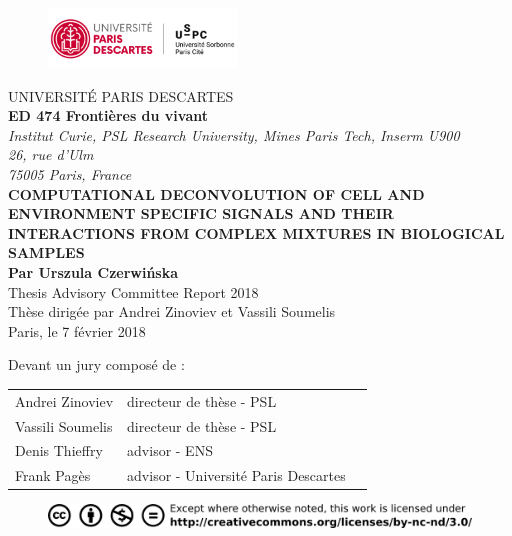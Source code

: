 \documentclass[12pt,]{book}
\title{}
\author{}
\date{}
\theoremstyle{definition}
\theoremstyle{definition}
\theoremstyle{definition}
\theoremstyle{remark}
\begin{document}
\begin{titlepage}
\frontmatter
\begin{figure}[t]
\includegraphics[width=5cm]{figures-ext/LogoParisDescartes}
\end{figure}
\begin{center}
UNIVERSITÉ PARIS DESCARTES \\
\vspace*{1cm}
\textbf{ED 474 Frontières du vivant}\\
\vspace*{0,5cm}
\textit{Institut Curie, PSL Research University, Mines Paris Tech, Inserm U900 \\26, rue d'Ulm\\ 75005 Paris, France}\\
\vspace*{1cm}
\LARGE{\textbf{COMPUTATIONAL DECONVOLUTION OF CELL AND ENVIRONMENT SPECIFIC SIGNALS AND
THEIR INTERACTIONS FROM COMPLEX MIXTURES IN BIOLOGICAL SAMPLES}}\\
\large{\textbf{Par Urszula Czerwińska}}\\
\vspace*{1cm}
Thesis Advisory Committee Report 2018\\
\vspace*{1cm}
Thèse dirigée par Andrei Zinoviev et Vassili Soumelis\\
\vspace*{1cm}
\small{Paris, le 7 février 2018}\\
\end{center}
\vspace*{1cm}
\begin{footnotesize}
Devant un jury composé de : \\
\begin{tabular}{lll}
Andrei Zinoviev & directeur de thèse - PSL\\
Vassili Soumelis & directeur de thèse - PSL\\
Denis Thieffry & advisor - ENS\\
Frank Pagès & advisor - Université Paris Descartes\\
\end{tabular}
\end{footnotesize}

\begin{figure}[b]
\begin{center}
\includegraphics{figures-ext/creativecommons}
\end{center}
\end{figure}





\end{titlepage}
\end{document}
